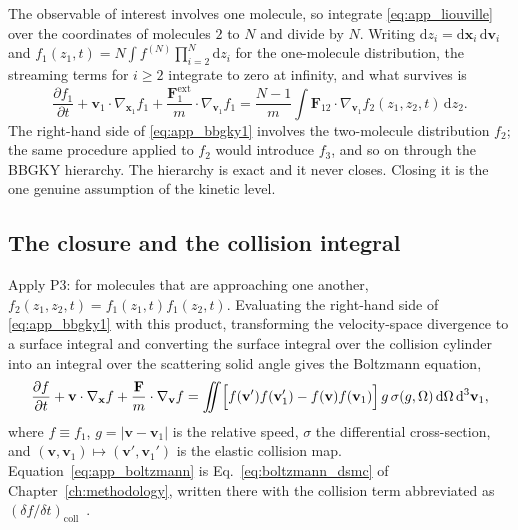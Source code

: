The observable of interest involves one molecule, so integrate \eqref{eq:app_liouville} over the coordinates of molecules $2$ to $N$ and divide by $N$. Writing $\mathrm{d}z_i = \mathrm{d}\mathbf{x}_i\,\mathrm{d}\mathbf{v}_i$ and $f_1(z_1,t) = N\int f^{(N)}\prod_{i=2}^{N}\mathrm{d}z_i$ for the one-molecule distribution, the streaming terms for $i \ge 2$ integrate to zero at infinity, and what survives is
\begin{equation}
    \frac{\partial f_1}{\partial t} + \mathbf{v}_1\cdot\nabla_{\mathbf{x}_1} f_1 + \frac{\mathbf{F}^{\mathrm{ext}}_1}{m}\cdot\nabla_{\mathbf{v}_1} f_1
    = \frac{N-1}{m}\int \mathbf{F}_{12}\cdot\nabla_{\mathbf{v}_1} f_2(z_1,z_2,t)\,\mathrm{d}z_2 .
    \label{eq:app_bbgky1}
\end{equation}
The right-hand side of \eqref{eq:app_bbgky1} involves the two-molecule distribution $f_2$; the same procedure applied to $f_2$ would introduce $f_3$, and so on through the BBGKY hierarchy. The hierarchy is exact and it never closes. Closing it is the one genuine assumption of the kinetic level.

\subsection{The closure and the collision integral}

Apply P3: for molecules that are approaching one another, $f_2(z_1,z_2,t) = f_1(z_1,t)f_1(z_2,t)$. Evaluating the right-hand side of \eqref{eq:app_bbgky1} with this product, transforming the velocity-space divergence to a surface integral and converting the surface integral over the collision cylinder into an integral over the scattering solid angle gives the Boltzmann equation,
\begin{equation}
    \frac{\partial f}{\partial t} + \mathbf{v}\cdot\nabla_{\mathbf{x}} f + \frac{\mathbf{F}}{m}\cdot\nabla_{\mathbf{v}} f
    = \iint \Bigl[f(\mathbf{v}')f(\mathbf{v}_1') - f(\mathbf{v})f(\mathbf{v}_1)\Bigr]\, g\,\sigma(g,\Omega)\,\mathrm{d}\Omega\,\mathrm{d}^3\mathbf{v}_1 ,
    \label{eq:app_boltzmann}
\end{equation}
where $f \equiv f_1$, $g = |\mathbf{v}-\mathbf{v}_1|$ is the relative speed, $\sigma$ the differential cross-section, and $(\mathbf{v},\mathbf{v}_1) \mapsto (\mathbf{v}',\mathbf{v}_1')$ is the elastic collision map. Equation~\eqref{eq:app_boltzmann} is Eq.~\eqref{eq:boltzmann_dsmc} of Chapter~\ref{ch:methodology}, written there with the collision term abbreviated as $(\delta f/\delta t)_{\mathrm{coll}}$~\cite{boltzmann1872,cercignani1988}.

